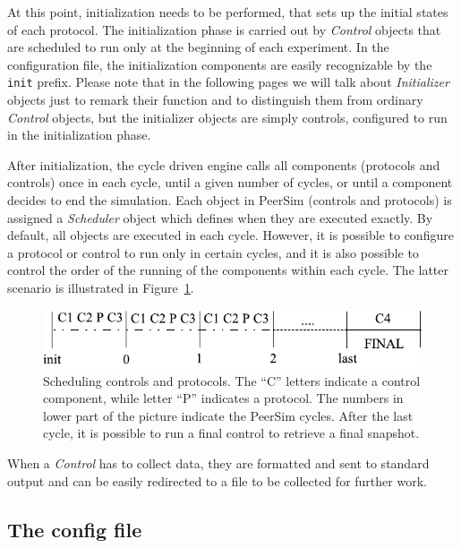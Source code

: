 \documentclass[a4paper,11pt]{article}
\begin{document}
At this point, initialization needs to be performed, that sets up the
initial states of each protocol.
The initialization phase is carried out by \emph{Control}
objects that are scheduled to run only at the beginning of each experiment.
In the configuration file,
the initialization components are easily recognizable by the
\texttt{init} prefix. Please note that in the following pages we will
talk about \emph{Initializer} objects just to remark their function and
to distinguish them from ordinary \emph{Control} objects, but the initializer
objects are simply controls, configured to run in the initialization phase.

After initialization, the cycle driven engine calls all components (protocols
and controls) once in each cycle, until a given number of cycles, or until
a component decides to end the simulation.
Each object in PeerSim (controls and protocols) is assigned a
\emph{Scheduler} object which defines when they are executed exactly.
By default, all objects are executed in each cycle.
However, it is possible to configure a protocol or control to run only in
certain cycles, and it is also possible to control the order of the running
of the components within each cycle.
The latter scenario is illustrated in Figure~\ref{obsfigure}. 


\begin{figure}
\begin{center}
\includegraphics[scale=1.1]{controls-protocols}
\end{center}
\caption{Scheduling controls and protocols. The ``C'' letters indicate a
  control component, while letter ``P'' indicates a protocol.
  The numbers in lower part of the picture indicate the
  PeerSim cycles. After the last cycle, it is possible to run a final
  control to retrieve a final snapshot.\label{obsfigure}}
\end{figure}


When a \emph{Control} has to collect data, they are formatted and sent to
standard output and can be easily redirected to a file to be collected
for further work. 


\subsection{The config file}
\label{configfile}
\end{document}
